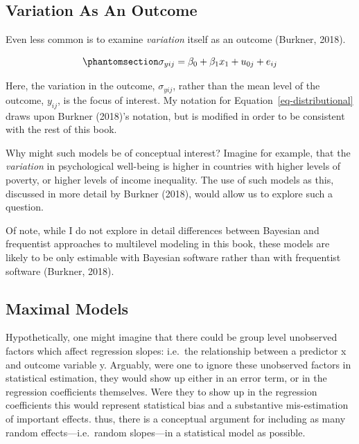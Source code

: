 \documentclass[
  letterpaper,
  DIV=11,
  numbers=noendperiod]{scrreprt}
\begin{document}
\subsection{Variation As An Outcome}\label{variation-as-an-outcome}

Even less common is to examine \emph{variation} itself as an outcome
(Burkner, 2018). 

\begin{equation}\phantomsection\label{eq-distributional}{\sigma_{yij} = \beta_0 + \beta_1 x_1 + u_{0j} + e_{ij}}\end{equation}

Here, the variation in the outcome, \(\sigma_{yij}\), rather than the
mean level of the outcome, \(y_{ij}\), is the focus of interest. My
notation for Equation~\ref{eq-distributional} draws upon Burkner
(2018)'s notation, but is modified in order to be consistent with the
rest of this book.

Why might such models be of conceptual interest? Imagine for example,
that the \emph{variation} in psychological well-being is higher in
countries with higher levels of poverty, or higher levels of income
inequality. The use of such models as this, discussed in more detail by
Burkner (2018), would allow us to explore such a question.

Of note, while I do not explore in detail differences between Bayesian
and frequentist approaches to multilevel modeling in this book, these
models are likely to be only estimable with Bayesian software rather
than with frequentist software (Burkner, 2018).

\subsection{Maximal Models}\label{maximal-models}

Hypothetically, one might imagine that there could be group level
unobserved factors which affect regression slopes: i.e.~the relationship
between a predictor x and outcome variable y. Arguably, were one to
ignore these unobserved factors in statistical estimation, they would
show up either in an error term, or in the regression coefficients
themselves. Were they to show up in the regression coefficients this
would represent statistical bias and a substantive mis-estimation of
important effects. thus, there is a conceptual argument for including as
many random effects---i.e.~random slopes---in a statistical model as
possible. 
\end{document}

